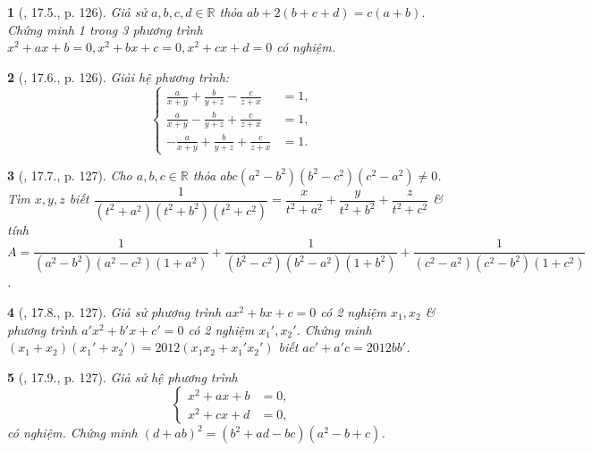 \documentclass{article}
\newtheorem{baitoan}{}
\begin{document}
\begin{baitoan}[\cite{TLCT_THCS_Toan_9_dai_so}, 17.5., p. 126]
	Giả sử $a,b,c,d\in\mathbb{R}$ thỏa $ab + 2(b + c + d) = c(a + b)$. Chứng minh 1 trong 3 phương trình $x^2 + ax + b = 0,x^2 + bx + c = 0,x^2 + cx + d = 0$ có nghiệm.
\end{baitoan}

\begin{baitoan}[\cite{TLCT_THCS_Toan_9_dai_so}, 17.6., p. 126]
	Giải hệ phương trình:
	\begin{equation*}
		\left\{\begin{split}
			\frac{a}{x + y} + \frac{b}{y + z} - \frac{c}{z + x} &= 1,\\
			\frac{a}{x + y} - \frac{b}{y + z} + \frac{c}{z + x} &= 1,\\
			-\frac{a}{x + y} + \frac{b}{y + z} + \frac{c}{z + x} &= 1.
		\end{split}\right.
	\end{equation*}
\end{baitoan}

\begin{baitoan}[\cite{TLCT_THCS_Toan_9_dai_so}, 17.7., p. 127]
	Cho $a,b,c\in\mathbb{R}$ thỏa $abc(a^2 - b^2)(b^2 - c^2)(c^2 - a^2)\ne0$. Tìm $x,y,z$ biết $\dfrac{1}{(t^2 + a^2)(t^2 + b^2)(t^2 + c^2)} = \dfrac{x}{t^2 + a^2} + \dfrac{y}{t^2 + b^2} + \dfrac{z}{t^2 + c^2}$ \& tính $A = \dfrac{1}{(a^2 - b^2)(a^2 - c^2)(1 + a^2)} + \dfrac{1}{(b^2 - c^2)(b^2 - a^2)(1 + b^2)} + \dfrac{1}{(c^2 - a^2)(c^2 - b^2)(1 + c^2)}$.
\end{baitoan}

\begin{baitoan}[\cite{TLCT_THCS_Toan_9_dai_so}, 17.8., p. 127]
	Giả sử phương trình $ax^2 + bx + c = 0$ có 2 nghiệm $x_1,x_2$ \& phương trình $a'x^2 + b'x + c' = 0$ có 2 nghiệm $x_1',x_2'$. Chứng minh $(x_1 + x_2)(x_1' + x_2') = 2012(x_1x_2 + x_1'x_2')$ biết $ac' + a'c = 2012bb'$.
\end{baitoan}

\begin{baitoan}[\cite{TLCT_THCS_Toan_9_dai_so}, 17.9., p. 127]
	Giả sử hệ phương trình
	\begin{equation*}
		\left\{\begin{split}
			x^2 + ax + b &= 0,\\
			x^2 + cx + d &= 0,
		\end{split}\right.
	\end{equation*}
	có nghiệm. Chứng minh $(d + ab)^2 = (b^2 + ad - bc)(a^2 - b + c)$.
\end{baitoan}
\end{document}
